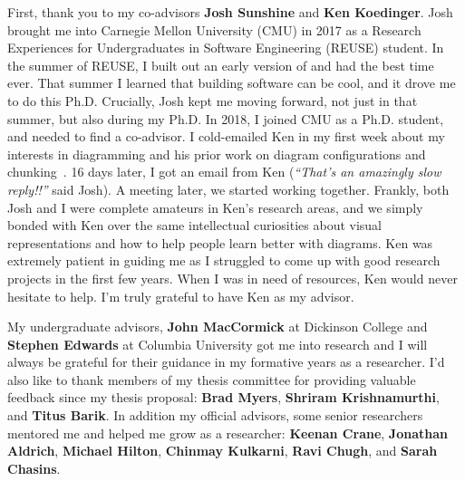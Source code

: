 First, thank you to my co-advisors \textbf{Josh Sunshine} and \textbf{Ken Koedinger}. Josh brought me into Carnegie Mellon University (CMU) in 2017 as a Research Experiences for Undergraduates in Software Engineering (REUSE) student. In the summer of REUSE, I built out an early version of \Penrose and had the best time ever. That summer I learned that building software can be cool, and it drove me to do this Ph.D. Crucially, Josh kept me moving forward, not just in that summer, but also during my Ph.D. In 2018, I joined CMU as a Ph.D. student, and needed to find a co-advisor. I cold-emailed Ken in my first week about my interests in diagramming and his prior work on diagram configurations and chunking~\cite{koedinger_emergent_1992}. 16 days later, I got an email from Ken (\textit{``That's an amazingly slow reply!!''} said Josh). A meeting later, we started working together. Frankly, both Josh and I were complete amateurs in Ken's research areas, and we simply bonded with Ken over the same intellectual curiosities about visual representations and how to help people learn better with diagrams. Ken was extremely patient in guiding me as I struggled to come up with good research projects in the first few years. When I was in need of resources, Ken would never hesitate to help. I'm truly grateful to have Ken as my advisor. 

My undergraduate advisors, \textbf{John MacCormick} at Dickinson College and \textbf{Stephen Edwards} at Columbia University got me into research and I will always be grateful for their guidance in my formative years as a researcher. I'd also like to thank members of my thesis committee for providing valuable feedback since my thesis proposal: \textbf{Brad Myers}, \textbf{Shriram Krishnamurthi}, and \textbf{Titus Barik}. In addition my official advisors, some senior researchers mentored me and helped me grow as a researcher: \textbf{Keenan Crane}, \textbf{Jonathan Aldrich}, \textbf{Michael Hilton}, \textbf{Chinmay Kulkarni}, \textbf{Ravi Chugh}, and \textbf{Sarah Chasins}.

